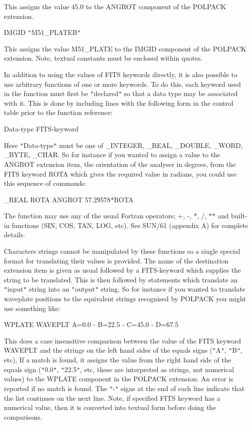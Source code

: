 {{      This assigns the value 45.0 to the ANGROT component of the POLPACK
      extension.

         IMGID              {\tt "}M51\_PLATEB{\tt "}

      This assigns the value M51\_PLATE to the IMGID component of the
      POLPACK extension. Note, textual constants must be enclosed within
      quotes.

      In addition to using the values of FITS keywords directly, it is also
      possible to use arbitrary functions of one or more keywords. To do
      this, each keyword used in the function must first be {\tt "}declared{\tt "} so
      that a data type may be associated with it. This is done by including
      lines with the following form in the control table prior to the
      function reference:

         Data-type          FITS-keyword

      Here {\tt "}Data-type{\tt "} must be one of \_INTEGER, \_REAL, \_DOUBLE, \_WORD, \_BYTE,
      \_CHAR. So for instance if you wanted to assign a value to the ANGROT
      extension item, the orientation of the analyser in degrees, from the
      FITS keyword ROTA which gives the required value in radians, you
      could use this sequence of commands:

         \_REAL             ROTA
         ANGROT            57.29578$*$ROTA

      The function may use any of the usual Fortran operators; $+$, -, $*$, /,
      $*$$*$ and built-in functions (SIN, COS, TAN, LOG, etc). See SUN/61
      (appendix A) for complete details.

      Characters strings cannot be manipulated by these functions so a single
      special format for translating their values is provided. The name
      of the destination extension item is given as usual followed by a
      FITS-keyword which supplies the string to be translated. This is then
      followed by statements which translate an {\tt "}input{\tt "} string into an
      {\tt "}output{\tt "} string. So for instance if you wanted to translate waveplate
      positions to the equivalent strings recognised by POLPACK you might
      use something like:

         WPLATE     WAVEPLT  A=0.0 -
                             B=22.5 -
                             C=45.0 -
                             D=67.5

      This does a case insensitive comparison between the value of the FITS
      keyword WAVEPLT and the strings on the left hand sides of the equals
      signs ({\tt "}A{\tt "}, {\tt "}B{\tt "}, etc), If a match is found, it assigns the value from
      the right hand side of the equals sign ({\tt "}0.0{\tt "}, {\tt "}22.5{\tt "}, etc, these
      are interpreted as strings, not numerical values) to the WPLATE
      component in the POLPACK extension. An error is reported if no match
      is found. The {\tt "}-{\tt "} signs at the end of each line indicate that the list
      continues on the next line. Note, if specified FITS keyword has a
      numerical value, then it is converted into textual form before doing
      the comparisons.

}}
